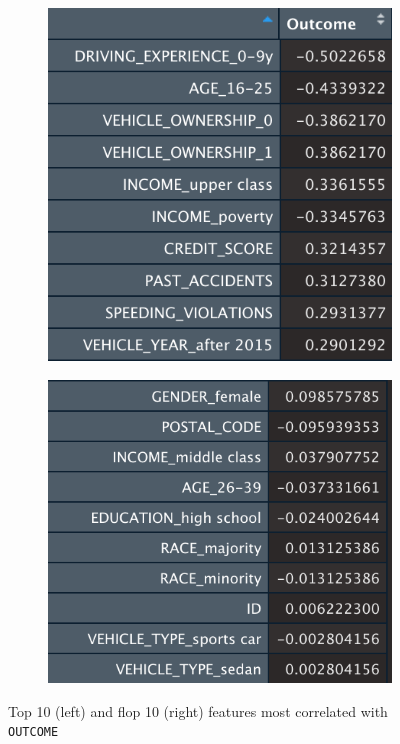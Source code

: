\documentclass[a4paper,11pt, titlepage]{article}
\begin{document}
\begin{figure}[h!]
    \centering
    \begin{subfigure}
    \centering
    \includegraphics[scale=0.5]{correlations.png}
    \end{subfigure}
    \hskip50pt
    \begin{subfigure}
        \centering
        \includegraphics[scale=0.5469]{correlations-flop10.png}
    \end{subfigure}
    \caption{\centering Top 10 (left) and flop 10 (right) features most correlated with {\tt OUTCOME}}
    \label{fig:corr}
\end{figure}
\end{document}
